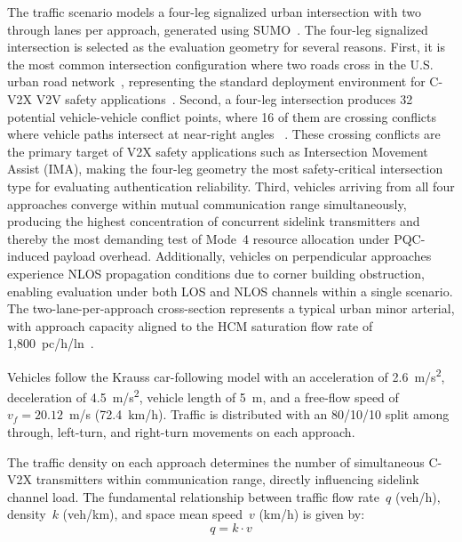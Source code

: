 \documentclass[letterpaper,journal]{IEEEtran}
\begin{document}
The traffic scenario models a four-leg signalized urban intersection with two through lanes per approach, generated using SUMO~\cite{lopez2018sumo}. The four-leg signalized intersection is selected as the evaluation geometry for several reasons. First, it is the most common intersection configuration where two roads cross in the U.S. urban road network~\cite{fhwa_sig_guide}, representing the standard deployment environment for C-V2X V2V safety applications~\cite{sae_j3161}. Second, a four-leg intersection produces 32 potential vehicle-vehicle conflict points, where 16 of them are crossing conflicts where vehicle paths intersect at near-right angles%
~\cite{fhwa_sig_guide}. These crossing conflicts are the primary target of V2X safety applications such as Intersection Movement Assist (IMA), making the four-leg geometry the most safety-critical intersection type for evaluating authentication reliability. Third, vehicles arriving from all four approaches converge within mutual communication range simultaneously, producing the highest concentration of concurrent sidelink transmitters and thereby the most demanding test of Mode~4 resource allocation under PQC-induced payload overhead. Additionally, vehicles on perpendicular approaches experience NLOS propagation conditions due to corner building obstruction, enabling evaluation under both LOS and NLOS channels within a single scenario. The two-lane-per-approach cross-section represents a typical urban minor arterial, with approach capacity aligned to the HCM saturation flow rate of 1{,}800~pc/h/ln~\cite{hcm2010}.

Vehicles follow the Krauss car-following model with an acceleration of 2.6~m/s\textsuperscript{2}, deceleration of 4.5~m/s\textsuperscript{2}, vehicle length of 5~m, and a free-flow speed of $v_f = 20.12$~m/s (72.4~km/h). Traffic is distributed with an 80/10/10 split among through, left-turn, and right-turn movements on each approach.

The traffic density on each approach determines the number of simultaneous C-V2X transmitters within communication range, directly influencing sidelink channel load. The fundamental relationship between traffic flow rate~$q$ (veh/h), density~$k$ (veh/km), and space mean speed~$v$ (km/h) is given by:
\begin{equation}
    q = k \cdot v
    \label{eq:flow_density}
\end{equation}
\end{document}

